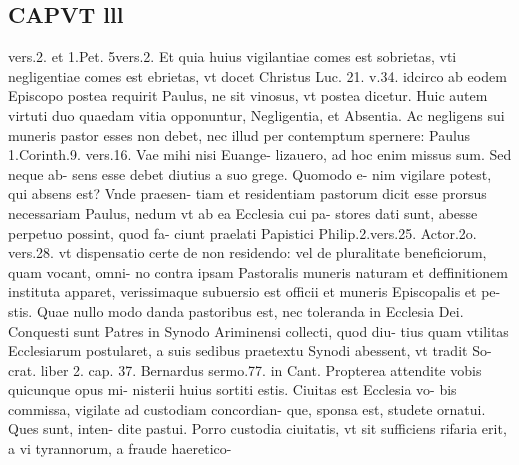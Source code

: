 \documentclass{article}
\begin{document}
\begin{pages}
\section*{CAPVT  lll }
\marginpar{[ p.119 ]}\pstart vers.2. et 1.Pet. 5vers.2. Et quia huius vigilantiae comes est sobrietas, vti negligentiae comes est ebrietas, vt docet Christus Luc. 21. v.34. idcirco ab eodem Episcopo postea requirit Paulus, ne sit vinosus, vt postea dicetur. Huic autem virtuti duo quaedam vitia opponuntur, Negligentia, et Absentia. Ac negligens sui muneris pastor esses non debet, nec illud per contemptum spernere: Paulus 1.Corinth.9. vers.16. Vae mihi nisi Euange- lizauero, ad hoc enim missus sum. Sed neque ab- sens esse debet diutius a suo grege. Quomodo e- nim vigilare potest, qui absens est? Vnde praesen- tiam et residentiam pastorum dicit esse prorsus necessariam Paulus, nedum vt ab ea Ecclesia cui pa- stores dati sunt, abesse perpetuo possint, quod fa- ciunt praelati Papistici Philip.2.vers.25. Actor.2o. vers.28. vt dispensatio certe de non residendo: vel de pluralitate beneficiorum, quam vocant, omni- no contra ipsam Pastoralis muneris naturam et deffinitionem instituta apparet, verissimaque subuersio est officii et muneris Episcopalis et pe- stis. Quae nullo modo danda pastoribus est, nec toleranda in Ecclesia Dei. Conquesti sunt Patres in Synodo Ariminensi collecti, quod diu- tius quam vtilitas Ecclesiarum postularet, a suis sedibus praetextu Synodi abessent, vt tradit So- crat. liber 2. cap. 37. Bernardus sermo.77. in Cant. Propterea attendite vobis quicunque opus mi- nisterii huius sortiti estis. Ciuitas est Ecclesia vo- bis commissa, vigilate ad custodiam concordian- que, sponsa est, studete ornatui. Ques sunt, inten- dite pastui. Porro custodia ciuitatis, vt sit sufficiens rifaria erit, a vi tyrannorum, a fraude haeretico-  \pend

\end{pages}
\end{document}
